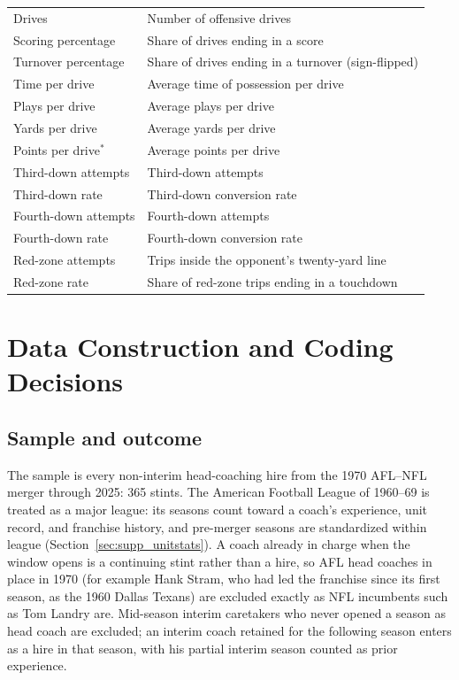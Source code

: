 \documentclass[12pt,USenglish]{article}
\begin{document}
{\begin{longtable}{@{}l l@{}}
Drives & Number of offensive drives \\
Scoring percentage & Share of drives ending in a score \\
Turnover percentage & Share of drives ending in a turnover (sign-flipped) \\
Time per drive & Average time of possession per drive \\
Plays per drive & Average plays per drive \\
Yards per drive & Average yards per drive \\
Points per drive$^{\ast}$ & Average points per drive \\
Third-down attempts & Third-down attempts \\
Third-down rate & Third-down conversion rate \\
Fourth-down attempts & Fourth-down attempts \\
Fourth-down rate & Fourth-down conversion rate \\
Red-zone attempts & Trips inside the opponent's twenty-yard line \\
Red-zone rate & Share of red-zone trips ending in a touchdown \\
\end{longtable}
}

\section{Data Construction and Coding Decisions}
\label{sec:supp_construction}

\subsection{Sample and outcome}
\label{sec:supp_sample}

The sample is every non-interim head-coaching hire from the 1970 AFL--NFL merger through 2025:
365 stints. The American Football League of 1960--69 is treated as a major league: its seasons
count toward a coach's experience, unit record, and franchise history, and pre-merger seasons
are standardized within league (Section~\ref{sec:supp_unitstats}). A coach already in charge
when the window opens is a continuing stint rather than a hire, so AFL head coaches in place in
1970 (for example Hank Stram, who had led the franchise since its first season, as the 1960
Dallas Texans) are excluded exactly as NFL
incumbents such as Tom Landry are. Mid-season interim caretakers who never opened a season as
head coach are excluded; an interim coach retained for the following season enters as a hire
in that season, with his partial interim season counted as prior experience.
\end{document}
